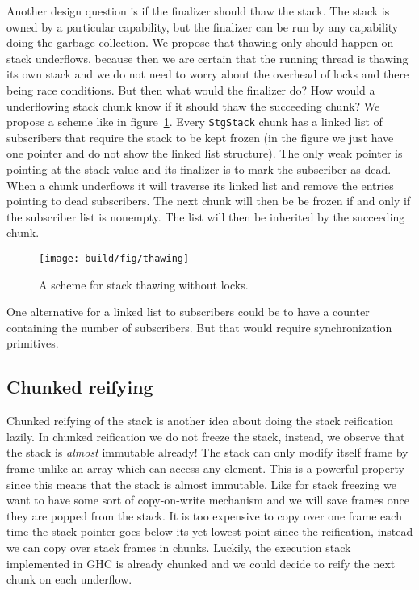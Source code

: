 Another design question is if the finalizer should thaw the stack. The
stack is owned by a particular capability, but the finalizer can be run by
any capability doing the garbage collection. We propose that thawing only
should happen on stack underflows, because then we are certain that the running
thread is thawing its own stack and we do not need to worry about the overhead of
locks and there being race conditions. But then what would the finalizer do? How would a underflowing
stack chunk know if it should thaw the succeeding chunk? We propose a scheme like in figure~\ref{fig:thawing}.
Every \texttt{StgStack} chunk has a linked list of subscribers that require the
stack to be kept frozen (in the figure we just have one pointer and do
not show the linked list structure). The only weak pointer is pointing at the stack value
and its finalizer is to mark the subscriber as dead. When a chunk underflows it
will traverse its linked list and remove the entries pointing to dead
subscribers. The next chunk will then be be frozen if and only if the subscriber list is nonempty.
The list will then be inherited by the succeeding chunk.

\begin{figure}
\begin{mdframed}
  \texttt{[image: build/fig/thawing]}
  \caption{A scheme for stack thawing without locks.}
  \label{fig:thawing}
\end{mdframed}
\end{figure}

One alternative for a linked list to subscribers could be to have a counter
containing the number of subscribers. But that would require synchronization
primitives.

\subsection{Chunked reifying} \label{sec:chunked_reifying}

Chunked reifying of the stack is another idea about doing the stack
reification lazily. In chunked reification we do not freeze the stack, instead, we observe
that the stack is \emph{almost} immutable already! The stack can only
modify itself frame by frame unlike an array which can access any
element. This is a powerful property since this means that the stack is
almost immutable. Like for stack freezing we want to have some sort of
copy-on-write mechanism and we will save frames once they are popped from
the stack. It is too expensive to copy over one frame each time the
stack pointer goes below its yet lowest point since the reification, instead we
can copy over stack frames in chunks.
Luckily, the execution stack implemented in GHC is already chunked
and we could decide to reify the next chunk on each underflow.

